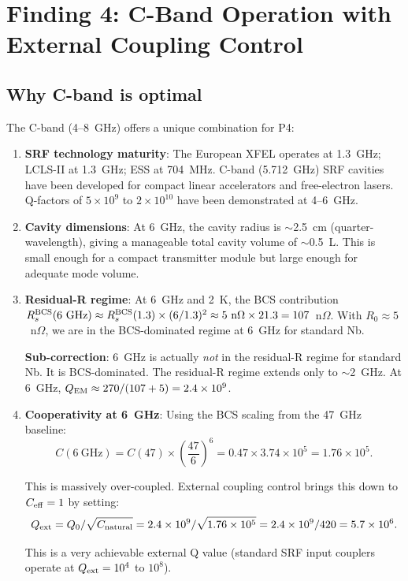 \documentclass[11pt]{article}
\newcommand{\ee}[1]{\times 10^{#1}}
\newcommand{\QEM}{Q_{\rm EM}}
\begin{document}
\section{Finding 4: C-Band Operation with External Coupling Control}
\label{sec:c-band}

\subsection{Why C-band is optimal}

The C-band (4--8~GHz) offers a unique combination for P4:

\begin{enumerate}
\item \textbf{SRF technology maturity}: The European XFEL operates at
  1.3~GHz; LCLS-II at 1.3~GHz; ESS at 704~MHz. C-band (5.712~GHz)
  SRF cavities have been developed for compact linear accelerators and
  free-electron lasers. Q-factors of $5\ee{9}$ to $2\ee{10}$ have been
  demonstrated at 4--6~GHz.

\item \textbf{Cavity dimensions}: At 6~GHz, the cavity radius is
  $\sim$2.5~cm (quarter-wavelength), giving a manageable total cavity
  volume of $\sim$0.5~L. This is small enough for a compact transmitter
  module but large enough for adequate mode volume.

\item \textbf{Residual-R regime}: At 6~GHz and 2~K, the BCS contribution
  $R_s^{\rm BCS}(6~\text{GHz}) \approx R_s^{\rm BCS}(1.3) \times
  (6/1.3)^2 \approx 5~\text{n}\Omega \times 21.3 = 107$~n$\Omega$. With
  $R_0 \approx 5$~n$\Omega$, we are in the BCS-dominated regime at 6~GHz
  for standard Nb.

  \textbf{Sub-correction}: 6~GHz is actually \emph{not} in the residual-R
  regime for standard Nb. It is BCS-dominated. The residual-R regime extends
  only to $\sim$2~GHz. At 6~GHz, $\QEM \approx 270/(107 + 5) = 2.4\ee{9}$.

\item \textbf{Cooperativity at 6~GHz}: Using the BCS scaling from the
  47~GHz baseline:
  \begin{equation}
  C(6~\text{GHz}) = C(47) \times \left(\frac{47}{6}\right)^6
  = 0.47 \times 3.74\ee{5} = 1.76\ee{5}.
  \end{equation}

  This is massively over-coupled. External coupling control brings this
  down to $C_{\rm eff} = 1$ by setting:
  \begin{equation}
  Q_{\rm ext} = Q_0 / \sqrt{C_{\rm natural}} = 2.4\ee{9} /
  \sqrt{1.76\ee{5}} = 2.4\ee{9} / 420 = 5.7\ee{6}.
  \end{equation}

  This is a very achievable external Q value (standard SRF input couplers
  operate at $Q_{\rm ext} = 10^4$ to $10^8$).
\end{enumerate}
\end{document}

